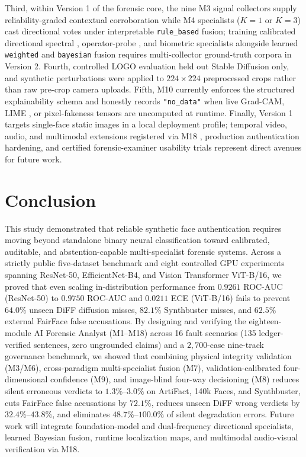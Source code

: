 \documentclass[final,5p,times,twocolumn,numafflabel]{elsarticle}
\begin{document}
Third, within Version 1 of the forensic core, the nine M3 signal collectors supply reliability-graded contextual corroboration while M4 specialists ($K = 1$ or $K = 3$) cast directional votes under interpretable \texttt{rule\_based} fusion; training calibrated directional spectral \cite{Yan_2026}, operator-probe \cite{Shen_2026}, and biometric \cite{Xue_2023} specialists alongside learned \texttt{weighted} and \texttt{bayesian} fusion requires multi-collector ground-truth corpora in Version 2. Fourth, controlled LOGO evaluation held out Stable Diffusion only, and synthetic perturbations were applied to $224\times 224$ preprocessed crops rather than raw pre-crop camera uploads. Fifth, M10 currently enforces the structured explainability schema and honestly records \texttt{"no\_data"} when live Grad-CAM, LIME \cite{Reza_2026}, or pixel-fakeness tensors \cite{Huang_2022} are uncomputed at runtime. Finally, Version 1 targets single-face static images in a local deployment profile; temporal video, audio, and multimodal extensions registered via M18 \cite{Croitoru_2026}, production authentication hardening, and certified forensic-examiner usability trials \cite{Hydara_2024} represent direct avenues for future work.

\section{Conclusion}
\label{sec:conclusion}

This study demonstrated that reliable synthetic face authentication requires moving beyond standalone binary neural classification toward calibrated, auditable, and abstention-capable multi-specialist forensic systems. Across a strictly public five-dataset benchmark and eight controlled GPU experiments spanning ResNet-50, EfficientNet-B4, and Vision Transformer ViT-B/16, we proved that even scaling in-distribution performance from $0.9261$ ROC-AUC (ResNet-50) to $0.9750$ ROC-AUC and $0.0211$ ECE (ViT-B/16) fails to prevent $64.0\%$ unseen DiFF diffusion misses, $82.1\%$ Synthbuster misses, and $62.5\%$ external FairFace false accusations. By designing and verifying the eighteen-module AI Forensic Analyst (M1--M18) across 16 fault scenarios (135 ledger-verified sentences, zero ungrounded claims) and a $2{,}700$-case nine-track governance benchmark, we showed that combining physical integrity validation (M3/M6), cross-paradigm multi-specialist fusion (M7), validation-calibrated four-dimensional confidence (M9), and image-blind four-way decisioning (M8) reduces silent erroneous verdicts to $1.3\%$--$3.0\%$ on ArtiFact, 140k Faces, and Synthbuster, cuts FairFace false accusations by $72.1\%$, reduces unseen DiFF wrong verdicts by $32.4\%$--$43.8\%$, and eliminates $48.7\%$--$100.0\%$ of silent degradation errors. Future work will integrate foundation-model and dual-frequency directional specialists, learned Bayesian fusion, runtime localization maps, and multimodal audio-visual verification via M18.
\end{document}
